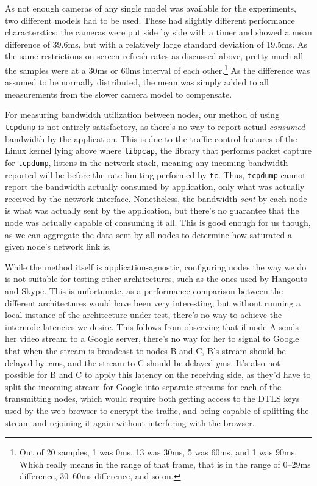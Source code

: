 As not enough cameras of any single model was available for the experiments, two different models had to be used. These had slightly different performance characterstics; the cameras were put side by side with a timer and showed a mean difference of 39.6ms, but with a relatively large standard deviation of 19.5ms. As the same restrictions on screen refresh rates as discussed above, pretty much all the samples were at a 30ms or 60ms interval of each other.\footnote{Out of 20 samples, 1 was 0ms, 13 was 30ms, 5 was 60ms, and 1 was 90ms. Which really means in the range of that frame, that is in the range of 0--29ms difference, 30--60ms difference, and so on.} As the difference was assumed to be normally distributed, the mean was simply added to all measurements from the slower camera model to compensate.

For measuring bandwidth utilization between nodes, our method of using \texttt{tcpdump} is not entirely satisfactory, as there's no way to report actual \emph{consumed} bandwidth by the application. This is due to the traffic control features of the Linux kernel lying above where \texttt{libpcap}, the library that performs packet capture for \texttt{tcpdump}, listens in the network stack, meaning any incoming bandwidth reported will be before the rate limiting performed by \texttt{tc}. Thus, \texttt{tcpdump} cannot report the bandwidth actually consumed by application, only what was actually received by the network interface. Nonetheless, the bandwidth \emph{sent} by each node is what was actually sent by the application, but there's no guarantee that the node was actually capable of consuming it all. This is good enough for us though, as we can aggregate the data sent by all nodes to determine how saturated a given node's network link is.

While the method itself is application-agnostic, configuring nodes the way we do is not suitable for testing other architectures, such as the ones used by Hangouts and Skype. This is unfortunate, as a performance comparison between the different architectures would have been very interesting, but without running a local instance of the architecture under test, there's no way to achieve the internode latencies we desire. This follows from observing that if node A sends her video stream to a Google server, there's no way for her to signal to Google that when the stream is broadcast to nodes B and C, B's stream should be delayed by $x$ms, and the stream to C should be delayed $y$ms. It's also not possible for B and C to apply this latency on the receiving side, as they'd have to split the incoming stream for Google into separate streams for each of the transmitting nodes, which would require both getting access to the DTLS keys used by the web browser to encrypt the traffic, and being capable of splitting the stream and rejoining it again without interfering with the browser.


